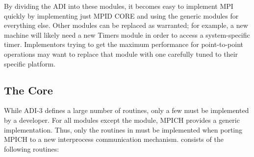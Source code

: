 \documentclass{article}
\begin{document}
By dividing the ADI into these modules, it becomes easy to implement
MPI quickly by implementing just MPID CORE and using the generic
modules for everything else.  Other modules can be replaced as
warranted; for example, a new machine will likely need a new Timers
module in order to access a system-specific timer.  Implementors
trying to get the maximum performance for point-to-point operations
may want to replace that module with one carefully tuned to their
specific platform.

\subsection{The Core}
\label{sec-minimal}

While ADI-3 defines a large number of routines, only a few must be implemented
by a developer.  For all modules except the  module, MPICH
provides a generic implementation.  Thus, only the routines in
 must be implemented when porting MPICH to a new interprocess
communication mechanism.   consists of the following routines: 
\end{document}
